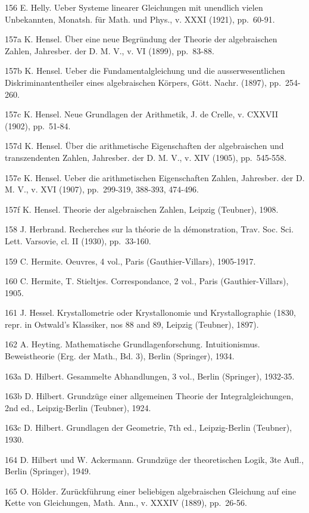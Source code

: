 156 E. Helly. Ueber Systeme linearer Gleichungen mit unendlich vielen Unbekannten, Monatsh. für Math. und Phys., v. XXXI (1921), pp.~60-91.

157a K. Hensel. Über eine neue Begründung der Theorie der algebraischen Zahlen, Jahresber. der D. M. V., v. VI (1899), pp.~83-88.

157b K. Hensel. Ueber die Fundamentalgleichung und die ausserwesentlichen Diskriminantentheiler eines algebraischen Körpers, Gött. Nachr. (1897), pp.~254-260.

157c K. Hensel. Neue Grundlagen der Arithmetik, J. de Crelle, v. CXXVII (1902), pp.~51-84.

157d K. Hensel. Über die arithmetische Eigenschaften der algebraischen und transzendenten Zahlen, Jahresber. der D. M. V., v. XIV (1905), pp.~545-558.

157e K. Hensel. Ueber die arithmetischen Eigenschaften Zahlen, Jahresber. der D. M. V., v. XVI (1907), pp.~299-319, 388-393, 474-496.

157f K. Hensel. Theorie der algebraischen Zahlen, Leipzig (Teubner), 1908.

158 J. Herbrand. Recherches sur la théorie de la démonstration, Trav. Soc. Sci. Lett. Varsovie, cl. II (1930), pp.~33-160.

159 C. Hermite. Oeuvres, 4 vol., Paris (Gauthier-Villars), 1905-1917.

160 C. Hermite, T. Stieltjes. Correspondance, 2 vol., Paris (Gauthier-Villars), 1905.

161 J. Hessel. Krystallometrie oder Krystallonomie und Krystallographie (1830, repr. in Ostwald's Klassiker, nos 88 and 89, Leipzig (Teubner), 1897).

162 A. Heyting. Mathematische Grundlagenforschung. Intuitionismus. Beweistheorie (Erg. der Math., Bd. 3), Berlin (Springer), 1934.

163a D. Hilbert. Gesammelte Abhandlungen, 3 vol., Berlin (Springer), 1932-35.

163b D. Hilbert. Grundzüge einer allgemeinen Theorie der Integralgleichungen, 2nd ed., Leipzig-Berlin (Teubner), 1924.

163c D. Hilbert. Grundlagen der Geometrie, 7th ed., Leipzig-Berlin (Teubner), 1930.

164 D. Hilbert und W. Ackermann. Grundzüge der theoretischen Logik, 3te Aufl., Berlin (Springer), 1949.

165 O. Hölder. Zurückführung einer beliebigen algebraischen Gleichung auf eine Kette von Gleichungen, Math. Ann., v. XXXIV (1889), pp.~26-56.

